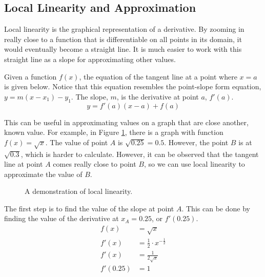 \documentclass[12pt]{article}
\begin{document}
\subsection{Local Linearity and Approximation}
Local linearity is the graphical representation of a derivative. By zooming in really close to a function that is differentiable on all points in its domain, it would eventually become a straight line. It is much easier to work with this straight line as a slope for approximating other values.

Given a function $f(x)$, the equation of the tangent line at a point where $x = a$ is given below. Notice that this equation resembles the point-slope form equation, $y = m(x - x_1) - y_1$. The slope, $m$, is the derivative at point $a$, $f'(a)$.
\[ y = f'(a) (x - a) + f(a) \]

This can be useful in approximating values on a graph that are close another, known value. For example, in Figure \ref{fig:linearity}, there is a graph with function $f(x) = \sqrt{x}$. The value of point $A$ is $\sqrt{0.25} = 0.5$. However, the point $B$ is at $\sqrt{0.3}$, which is harder to calculate. However, it can be observed that the tangent line at point $A$ comes really close to point $B$, so we can use local linearity to approximate the value of $B$.

\begin{figure}[H]
	\begin{center}
		\caption{A demonstration of local linearity.}
		\label{fig:linearity}
	\end{center}
\end{figure}

The first step is to find the value of the slope at point $A$. This can be done by finding the value of the derivative at $x_A = 0.25$, or $f'(0.25)$.
\begin{align*}
	f(x) &= \sqrt{x} \\
	f'(x) &= \frac{1}{2} \cdot x^{-\frac{1}{2}} \\[5pt]
	f'(x) &= \frac{1}{2 \sqrt{x}} \\[5pt]
	f'(0.25) &= 1
\end{align*}
\end{document}
